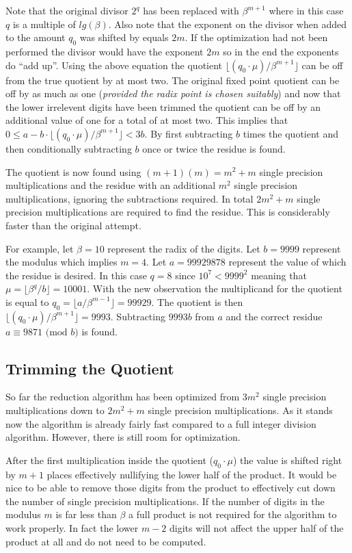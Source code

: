 \documentclass[b5paper]{book}
\begin{document}
Note that the original divisor $2^q$ has been replaced with $\beta^{m+1}$ where in this case $q$ is a multiple of $lg(\beta)$. Also note that the 
exponent on the divisor when added to the amount $q_0$ was shifted by equals $2m$.  If the optimization had not been performed the divisor 
would have the exponent $2m$ so in the end the exponents do ``add up''. Using the above equation the quotient 
$\lfloor (q_0 \cdot \mu) / \beta^{m+1} \rfloor$ can be off from the true quotient by at most two.  The original fixed point quotient can be off
by as much as one (\textit{provided the radix point is chosen suitably}) and now that the lower irrelevent digits have been trimmed the quotient
can be off by an additional value of one for a total of at most two.  This implies that 
$0 \le a - b \cdot \lfloor (q_0 \cdot \mu) / \beta^{m+1} \rfloor < 3b$.  By first subtracting $b$ times the quotient and then conditionally subtracting 
$b$ once or twice the residue is found.

The quotient is now found using $(m + 1)(m) = m^2 + m$ single precision multiplications and the residue with an additional $m^2$ single
precision multiplications, ignoring the subtractions required.  In total $2m^2 + m$ single precision multiplications are required to find the residue.  
This is considerably faster than the original attempt.

For example, let $\beta = 10$ represent the radix of the digits.  Let $b = 9999$ represent the modulus which implies $m = 4$. Let $a = 99929878$ 
represent the value of which the residue is desired.  In this case $q = 8$ since $10^7 < 9999^2$ meaning that $\mu = \lfloor \beta^{q}/b \rfloor = 10001$.  
With the new observation the multiplicand for the quotient is equal to $q_0 = \lfloor a / \beta^{m - 1} \rfloor = 99929$.  The quotient is then 
$\lfloor (q_0 \cdot \mu) / \beta^{m+1} \rfloor = 9993$.  Subtracting $9993b$ from $a$ and the correct residue $a \equiv 9871 \mbox{ (mod }b\mbox{)}$ 
is found.  

\subsection{Trimming the Quotient}
So far the reduction algorithm has been optimized from $3m^2$ single precision multiplications down to $2m^2 + m$ single precision multiplications.  As 
it stands now the algorithm is already fairly fast compared to a full integer division algorithm.  However, there is still room for
optimization.  

After the first multiplication inside the quotient ($q_0 \cdot \mu$) the value is shifted right by $m + 1$ places effectively nullifying the lower
half of the product.  It would be nice to be able to remove those digits from the product to effectively cut down the number of single precision 
multiplications.  If the number of digits in the modulus $m$ is far less than $\beta$ a full product is not required for the algorithm to work properly.  
In fact the lower $m - 2$ digits will not affect the upper half of the product at all and do not need to be computed.  
\end{document}
